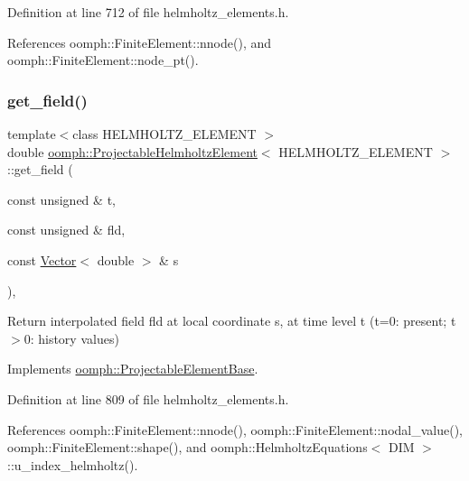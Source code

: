 Definition at line 712 of file helmholtz\+\_\+elements.\+h.



References oomph\+::\+Finite\+Element\+::nnode(), and oomph\+::\+Finite\+Element\+::node\+\_\+pt().

\mbox{\label{classoomph_1_1ProjectableHelmholtzElement_a6635aa1b760348ac92784c4e7bb6db38}} 
\subsubsection{\texorpdfstring{get\+\_\+field()}{get\_field()}}
{\footnotesize\ttfamily template$<$class H\+E\+L\+M\+H\+O\+L\+T\+Z\+\_\+\+E\+L\+E\+M\+E\+NT $>$ \\
double \hyperlink{classoomph_1_1ProjectableHelmholtzElement}{oomph\+::\+Projectable\+Helmholtz\+Element}$<$ H\+E\+L\+M\+H\+O\+L\+T\+Z\+\_\+\+E\+L\+E\+M\+E\+NT $>$\+::get\+\_\+field (\begin{DoxyParamCaption}\item[{const unsigned \&}]{t,  }\item[{const unsigned \&}]{fld,  }\item[{const \hyperlink{classoomph_1_1Vector}{Vector}$<$ double $>$ \&}]{s }\end{DoxyParamCaption})\hspace{0.3cm}{\ttfamily [inline]}, {\ttfamily [virtual]}}



Return interpolated field fld at local coordinate s, at time level t (t=0\+: present; t$>$0\+: history values) 



Implements \hyperlink{classoomph_1_1ProjectableElementBase_ae4da5b565b6d333be2f5920f7be763cd}{oomph\+::\+Projectable\+Element\+Base}.



Definition at line 809 of file helmholtz\+\_\+elements.\+h.



References oomph\+::\+Finite\+Element\+::nnode(), oomph\+::\+Finite\+Element\+::nodal\+\_\+value(), oomph\+::\+Finite\+Element\+::shape(), and oomph\+::\+Helmholtz\+Equations$<$ D\+I\+M $>$\+::u\+\_\+index\+\_\+helmholtz().

